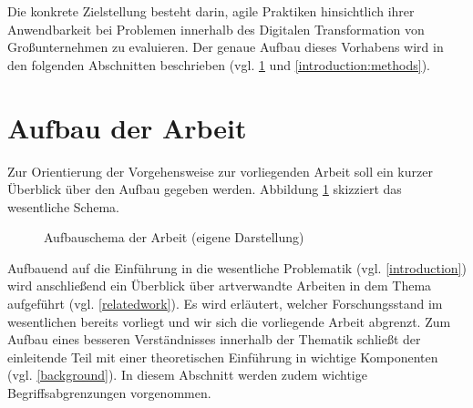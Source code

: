 Die konkrete Zielstellung besteht darin, agile Praktiken hinsichtlich ihrer Anwendbarkeit bei Problemen innerhalb des Digitalen Transformation von Großunternehmen zu evaluieren. Der genaue Aufbau dieses Vorhabens wird in den folgenden Abschnitten beschrieben (vgl. \ref{introduction:schema} und \ref{introduction:methods}).

\section{Aufbau der Arbeit}
\label{introduction:schema}

Zur Orientierung der Vorgehensweise zur vorliegenden Arbeit soll ein kurzer Überblick über den Aufbau gegeben werden. Abbildung \ref{fig:aufbau} skizziert das wesentliche Schema.

\begin{figure}[H]
	\centering
	\caption[Aufbauschema der Arbeit]{Aufbauschema der Arbeit (eigene Darstellung)}
	\label{fig:aufbau}
\end{figure}

Aufbauend auf die Einführung in die wesentliche Problematik  (vgl. \ref{introduction}) wird anschließend ein Überblick über artverwandte Arbeiten in dem Thema aufgeführt (vgl. \ref{relatedwork}). Es wird erläutert, welcher Forschungsstand im wesentlichen bereits vorliegt und wir sich die vorliegende Arbeit abgrenzt. Zum Aufbau eines besseren Verständnisses innerhalb der Thematik schließt der einleitende Teil mit einer theoretischen Einführung in wichtige Komponenten (vgl. \ref{background}). In diesem Abschnitt werden zudem wichtige Begriffsabgrenzungen vorgenommen.

